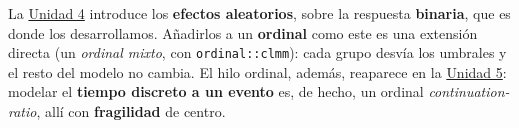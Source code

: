\documentclass[
  letterpaper,
  DIV=11,
  numbers=noendperiod]{scrartcl}
\begin{document}
\begin{tcolorbox}[enhanced jigsaw, coltitle=black, rightrule=.15mm, arc=.35mm, leftrule=.75mm, colback=white, colbacktitle=quarto-callout-note-color!10!white, left=2mm, breakable, toptitle=1mm, toprule=.15mm, bottomtitle=1mm, titlerule=0mm, title=\textcolor{quarto-callout-note-color}{\faInfo}\hspace{0.5em}{Puente a la Unidad 4}, bottomrule=.15mm, opacityback=0, opacitybacktitle=0.6, colframe=quarto-callout-note-color-frame]

La \protect\hyperlink{sec-u14}{Unidad 4} introduce los \textbf{efectos
aleatorios}, sobre la respuesta \textbf{binaria}, que es donde los
desarrollamos. Añadirlos a un \textbf{ordinal} como este es una
extensión directa (un \emph{ordinal mixto}, con \texttt{ordinal::clmm}):
cada grupo desvía los umbrales y el resto del modelo no cambia. El hilo
ordinal, además, reaparece en la \protect\hyperlink{sec-u15}{Unidad 5}:
modelar el \textbf{tiempo discreto a un evento} es, de hecho, un ordinal
\emph{continuation-ratio}, allí con \textbf{fragilidad} de centro.

\end{tcolorbox}
\end{document}
